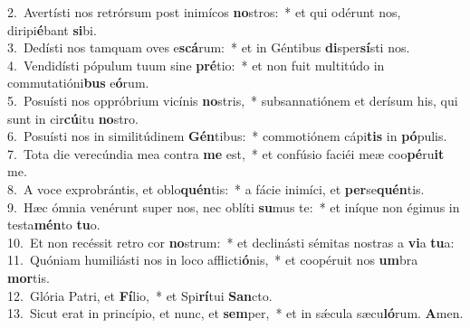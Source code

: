 {2.~}Avertísti nos retrórsum post inimícos \textbf{no}stros:~* et qui odérunt nos, diripi\textbf{é}bant \textbf{si}bi.\\
{3.~}Dedísti nos tamquam oves e\textbf{scá}rum:~* et in Géntibus \textbf{di}sper\textbf{sí}sti nos.\\
{4.~}Vendidísti pópulum tuum sine \textbf{pré}tio:~* et non fuit multitúdo in commutatióni\textbf{bus} e\textbf{ó}rum.\\
{5.~}Posuísti nos oppróbrium vicínis \textbf{no}stris,~* subsannatiónem et derísum his, qui sunt in cir\textbf{cú}itu \textbf{no}stro.\\
{6.~}Posuísti nos in similitúdinem \textbf{Gén}tibus:~* commotiónem cápi\textbf{tis} in \textbf{pó}pulis.\\
{7.~}Tota die verecúndia mea contra \textbf{me} est,~* et confúsio faciéi meæ coo\textbf{pé}ru\textbf{it} me.\\
{8.~}A voce exprobrántis, et oblo\textbf{quén}tis:~* a fácie inimíci, et \textbf{per}se\textbf{quén}tis.\\
{9.~}Hæc ómnia venérunt super nos, nec oblíti \textbf{su}mus te:~* et iníque non égimus in testa\textbf{mén}to \textbf{tu}o.\\
{10.~}Et non recéssit retro cor \textbf{no}strum:~* et declinásti sémitas nostras a \textbf{vi}a \textbf{tu}a:\\
{11.~}Quóniam humiliásti nos in loco afflicti\textbf{ó}nis,~* et coopéruit nos \textbf{um}bra \textbf{mor}tis.\\
{12.~}Glória Patri, et \textbf{Fí}lio,~* et Spi\textbf{rí}tui \textbf{San}cto.\\
{13.~}Sicut erat in princípio, et nunc, et \textbf{sem}per,~* et in sǽcula sæcu\textbf{ló}rum. \textbf{A}men.\\
